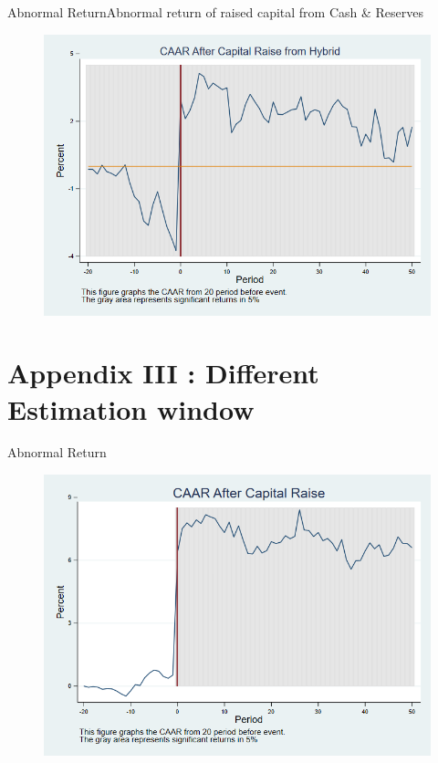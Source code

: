 \documentclass{beamer}
\begin{document}
\begin{frame}{Abnormal Return}{Abnormal return of raised capital from Cash \& Reserves}
	\label{car_industryHybrid}
	\begin{figure}
		\centering
		\includegraphics[width=0.65\linewidth]{Output/car_industryHybrid.png}
		\label{fig:car_industryHybrid}
	\end{figure}
\end{frame}



\section{Appendix III : Different Estimation window}
\begin{frame}{Abnormal Return}
	\label{car_abnormalreturn2}
	\begin{figure}
		\centering
		\includegraphics[width=0.7\linewidth]{Output/car_abnormalreturn2.png}
		\label{fig:car_abnormalreturn2}
	\end{figure}
\end{frame}
\end{document}
